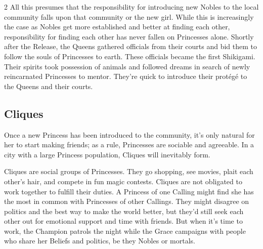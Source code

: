 \begin{multicols}{2}
All this presumes that the responsibility for introducing new Nobles to the local community falls upon that community or the new girl. While this is increasingly the case as Nobles get more established and better at finding each other, responsibility for finding each other has never fallen on Princesses alone. Shortly after the Release, the Queens gathered officials from their courts and bid them to follow the souls of Princesses to earth. These officials became the first Shikigami. Their spirits took possession of animals and followed dreams in search of newly reincarnated Princesses to mentor. They're quick to introduce their prot\'eg\'e to the Queens and their courts. 

\subsection*{Cliques}

Once a new Princess has been introduced to the community, it's only natural for her to start making friends; as a rule, Princesses are sociable and agreeable. In a city with a large Princess population, Cliques will inevitably form. 

Cliques are social groups of Princesses. They go shopping, see movies, plait each other's hair, and compete in fun magic contests. Cliques are not obligated to work together to fulfill their duties. A Princess of one Calling might find she has the most in common with Princesses of other Callings. They might disagree on politics and the best way to make the world better, but they'd still seek each other out for emotional support and time with friends. But when it's time to work, the Champion patrols the night while the Grace campaigns with people who share her Beliefs and politics, be they Nobles or mortals.


\end{multicols}
